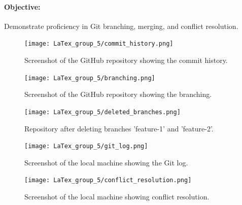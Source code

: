 \documentclass[a4paper,12pt]{article}
\begin{document}
\paragraph{Objective:} Demonstrate proficiency in Git branching, merging, and conflict resolution.

\vspace{0.5cm}

\begin{figure}[h!]
    \centering
    \texttt{[image: LaTex\_group\_5/commit\_history.png]} %
     \hspace{4 cm}
    \caption{Screenshot of the GitHub repository showing the commit history.}
\end{figure}

\begin{figure}[h!]
    \centering
    \texttt{[image: LaTex\_group\_5/branching.png]} %
     \hspace{4 cm}
    \caption{Screenshot of the GitHub repository showing the branching.}
\end{figure}
\newpage
{}
\vspace{-1.5cm}

\begin{figure}[h!]
    \centering
    \texttt{[image: LaTex\_group\_5/deleted\_branches.png]}
       \hspace{4 cm}
    \caption{Repository after deleting branches 'feature-1' and 'feature-2'.}
    \label{fig:enter-label}
\end{figure}
\hspace{6 cm}
\begin{figure}[h!]
    \centering
    \texttt{[image: LaTex\_group\_5/git\_log.png]} %
    \hspace{4 cm}
    \caption{Screenshot of the local machine showing the Git log.}
\end{figure}
\hspace{6 cm}
\begin{figure}[h!]
    \centering
    \texttt{[image: LaTex\_group\_5/conflict\_resolution.png]} %
       \hspace{4 cm}
    \caption{Screenshot of the local machine showing conflict resolution.}
\end{figure}
\newpage
{}
\vspace{0.5 cm}
\end{document}
